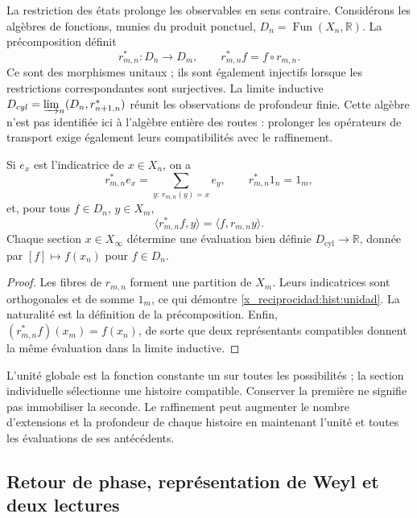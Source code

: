 La restriction des états prolonge les observables en sens contraire.
Considérons les algèbres de fonctions, munies du produit ponctuel,
\(D_n=\operatorname{Fun}(X_n,\mathbb R)\). La précomposition définit
\begin{equation}
 r_{m,n}^*:D_n\longrightarrow D_m,
 \qquad r_{m,n}^*f=f\circ r_{m,n}.
 \label{x_reciprocidad:hist:precomposicion}
\end{equation}
Ce sont des morphismes unitaux ; ils sont également injectifs lorsque les restrictions
correspondantes sont surjectives. La limite inductive
\(D_{\mathrm{cyl}}=\varinjlim_n(D_n,r_{n+1,n}^*)\) réunit les
observations de profondeur finie. Cette algèbre n’est pas identifiée ici
à l’algèbre entière des routes : prolonger les opérateurs de transport exige
également leurs compatibilités avec le raffinement.

\begin{lemma}
Si \(e_x\) est l’indicatrice de \(x\in X_n\), on a
\begin{equation}
 r_{m,n}^*e_x=\sum_{y:\,r_{m,n}(y)=x}e_y,
 \qquad r_{m,n}^*1_n=1_m,
 \label{x_reciprocidad:hist:unidad}
\end{equation}
et, pour tous \(f\in D_n\), \(y\in X_m\),
\[
 \langle r_{m,n}^*f,y\rangle=\langle f,r_{m,n}y\rangle.
\]
Chaque section \(x\in X_\infty\) détermine une évaluation bien définie
\(D_{\mathrm{cyl}}\to\mathbb R\), donnée par \([f]\mapsto f(x_n)\)
pour \(f\in D_n\).
\end{lemma}
\begin{proof}
Les fibres de \(r_{m,n}\) forment une partition de \(X_m\). Leurs
indicatrices sont orthogonales et de somme \(1_m\), ce qui démontre
\eqref{x_reciprocidad:hist:unidad}. La naturalité est la définition de la précomposition.
Enfin, \((r_{m,n}^*f)(x_m)=f(x_n)\), de sorte que deux représentants
compatibles donnent la même évaluation dans la limite inductive.
\end{proof}

L’unité globale est la fonction constante un sur toutes les possibilités ;
la section individuelle sélectionne une histoire compatible. Conserver la
première ne signifie pas immobiliser la seconde. Le raffinement peut augmenter
le nombre d’extensions et la profondeur de chaque histoire en maintenant
l’unité et toutes les évaluations de ses antécédents.

\subsection{Retour de phase, représentation de Weyl et deux lectures}
\label{x_reciprocidad:hist:puente-lecturas}


